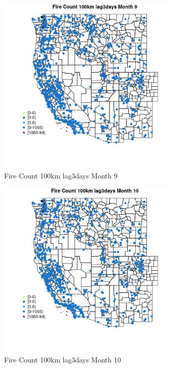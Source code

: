 \begin{figure} 
\centering  
\includegraphics[width=0.77\textwidth]{Code_Outputs/Report_ML_input_PM25_Step4_part_f_de_duplicated_aveswNAs_MapObsMo9Fire_Count_100km_lag3days.jpg} 
\caption{\label{fig:Report_ML_input_PM25_Step4_part_f_de_duplicated_aveswNAsMapObsMo9Fire_Count_100km_lag3days}Fire Count 100km lag3days Month 9} 
\end{figure} 
 

\clearpage 

\begin{figure} 
\centering  
\includegraphics[width=0.77\textwidth]{Code_Outputs/Report_ML_input_PM25_Step4_part_f_de_duplicated_aveswNAs_MapObsMo10Fire_Count_100km_lag3days.jpg} 
\caption{\label{fig:Report_ML_input_PM25_Step4_part_f_de_duplicated_aveswNAsMapObsMo10Fire_Count_100km_lag3days}Fire Count 100km lag3days Month 10} 
\end{figure} 
 

